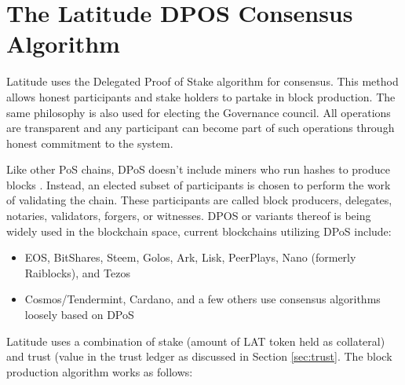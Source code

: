\newpage
\section{The Latitude DPOS Consensus Algorithm}
\label{app:dpos}

Latitude uses the Delegated Proof of Stake algorithm for consensus. This method allows honest participants and stake
holders to partake in block production. The same philosophy is also used for electing the Governance council. All
operations are transparent and any participant can become part of such operations through honest commitment to the
system.

Like other PoS chains, DPoS doesn’t include miners who run hashes to produce blocks . Instead, an elected subset of
participants is chosen to perform the work of validating the chain. These participants are called block producers,
delegates, notaries, validators, forgers, or witnesses. DPOS or variants thereof is being widely used in the blockchain
space, current blockchains utilizing DPoS include:

\begin{itemize}
\item EOS, BitShares, Steem, Golos, Ark, Lisk, PeerPlays, Nano (formerly Raiblocks), and Tezos
\item Cosmos/Tendermint, Cardano, and a few others use consensus algorithms loosely based on DPoS
\end{itemize}

Latitude uses a combination of stake (amount of LAT token held as collateral) and trust (value in the trust ledger as
discussed in Section \ref{sec:trust}. The block production algorithm works as follows:

